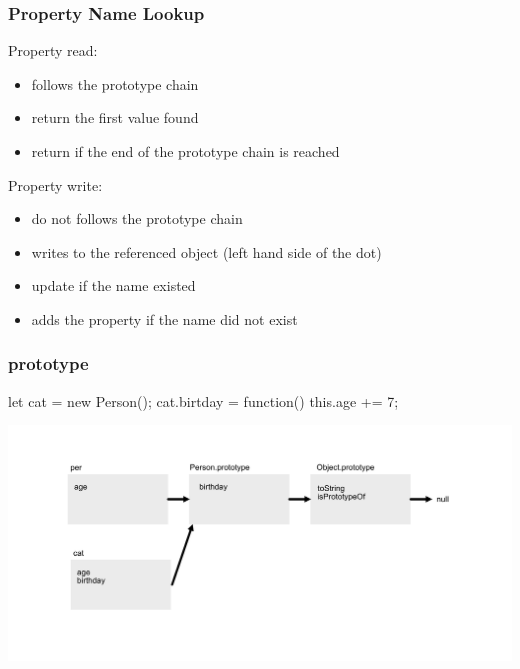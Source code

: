 \begin{frame}[fragile] \frametitle{Property Name Lookup}
Property read:
\begin{itemize}
  \item follows the prototype chain
  \item return the first value found
  \item return  if the end of the prototype chain is reached
\end{itemize}
\vspace{8mm}
Property write:
\begin{itemize}
  \item do not follows the prototype chain
  \item writes to the referenced object (left hand side of the dot)
  \item update if the name existed
  \item adds the property if the name did not exist
\end{itemize}
\end{frame}

\begin{frame}[fragile] \frametitle{prototype}
\begin{CodeBox}{}
let cat = new Person();
cat.birtday = function() { this.age += 7; }
\end{CodeBox}
  \centering
  \includegraphics[width=14cm]{img/prototype_chain4}
\end{frame}

